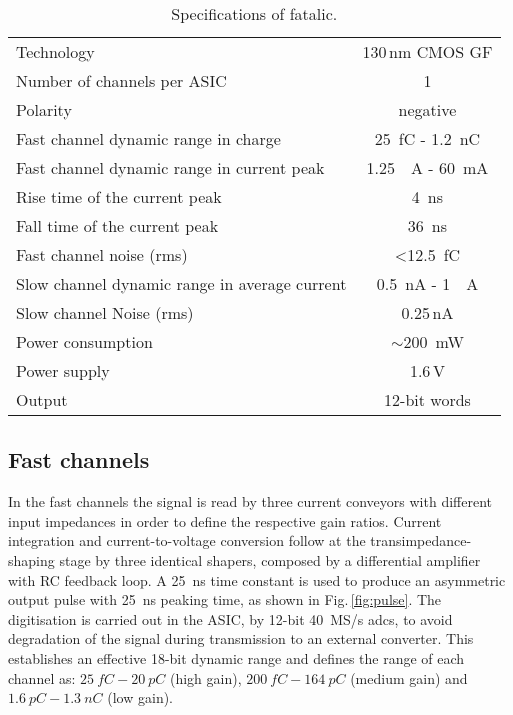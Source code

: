 \begin{table}[t]
	\begin{center}
		\begin{tabular}{l c}
			\toprule
			Technology & 130\,nm CMOS GF \\
			Number of channels per ASIC & 1 \\
			Polarity & negative \\
			Fast channel dynamic range in charge & \SI{25}{fC} - \SI{1.2}{nC}\\
			Fast channel dynamic range in current peak& \SI{1.25}{\mu A} - \SI{60}{mA}\\
			Rise time of the current peak & \SI{4}{ns}\\
			Fall time of the current peak & \SI{36}{ns} \\
			Fast channel noise (rms) & <\SI{12.5}{fC} \\
			Slow channel dynamic range in average current & \SI{0.5}{nA} - \SI{1}{\mu A} \\
			Slow channel Noise (rms) & 0.25\,nA \\
			Power consumption & $\sim$\SI{200}{mW} \\
			Power supply      & 1.6\,V \\
			Output            & 12-bit words \\
			\bottomrule
		\end{tabular}
		\caption{Specifications of \gls{fatalic}.\label{tab:f5_specs}}
	\end{center}
\end{table}

\subsection{Fast channels}
In the fast channels the signal is read by three current conveyors with different input impedances in order to define the respective gain ratios. 
Current integration and current-to-voltage conversion follow at the transimpedance-shaping stage by three identical shapers, composed by a 
differential amplifier with RC feedback loop. A \SI{25}{ns} time constant is used to produce an asymmetric output pulse with \SI{25}{ns} 
peaking time, as shown in Fig.\,\ref{fig:pulse}. The digitisation is carried out in the ASIC, by 12-bit \SI{40}{MS/s} \glspl{adc}, to avoid 
degradation of the signal during transmission to an external converter. This establishes an effective 18-bit dynamic range and defines the
range of each channel as: $\SI{25}{fC}-\SI{20}{pC}$ (high gain), $\SI{200}{fC}-\SI{164}{pC}$ (medium gain) and $\SI{1.6}{pC}-\SI{1.3}{nC}$ (low gain).

